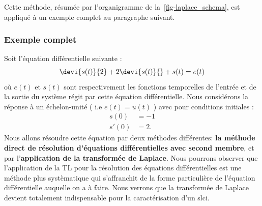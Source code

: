 Cette méthode, résumée par l'organigramme de la~\cref{fig-laplace_schema}, 
est appliqué à un exemple complet au paragraphe suivant.
\subsubsection{Exemple complet}
Soit l'équation différentielle suivante :
\begin{align}
\devi{s(t)}{2}+2\devi{s(t)}{} + s(t) = e(t)\label{eq-diff1}
\end{align}
où $e(t)$ et $s(t)$ sont respectivement les fonctions temporelles de l'entrée 
et de la sortie du système régit par cette équation différentielle. 
Nous considérons la réponse à un échelon-unité ( i.e $e(t)=u(t)$ ) 
avec pour conditions initiales :
\begin{align*}
    s(0) &=-1\\
    s'(0)&=2.
\end{align*}
Nous allons résoudre cette équation par deux méthodes différentes: 
\textbf{la méthode direct de résolution d'équations différentielles avec 
second membre}, et par l'\textbf{application de la transformée de Laplace}.
Nous pourrons observer que l'application de la TL pour la résolution
des équations différentielles est une méthode plus systèmatique qui 
s'affranchit de la forme particulière de l'équation différentielle 
auquelle on a à faire. Nous verrons que la transformée de Laplace devient 
totalement indispensable pour la caractérisation d'un \gls{slci}.
\newpage
{}
\captionsetup{width=0.9\linewidth}
